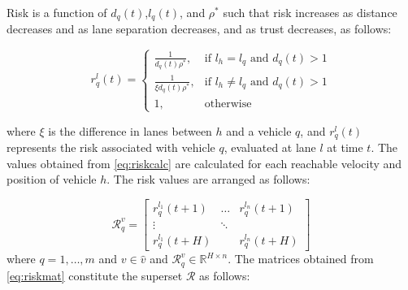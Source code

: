 \documentclass[letterpaper, 10 pt, conference]{ieeeconf}  %
\newcommand\NB[1]{$\spadesuit$\footnote{NB: #1}}
\newcommand\RP[1]{$\clubsuit$\footnote{RP: #1}}
\begin{document}



Risk is a function of $d_q(t)$,$l_q(t)$, and $\rho^*$ %
such that risk increases as distance decreases and as lane separation decreases, and as trust decreases, as follows: %

\begin{equation} \label{eq:riskcalc}
    r_{q}^{l}(t) =
    \begin{cases}
    \frac{1}{d_{q}(t)\rho^*},  & \text{if } l_h=l_q \text{ and } d_{q}(t) > 1  \\
    \frac{1}{\xi d_{q}(t)\rho^*},  & \text{if } l_h\neq l_q \text{ and } d_{q}(t) > 1  \\
        1,                     & \text{otherwise}  
    \end{cases}
\end{equation}

where $\xi$ is the difference in lanes between $h$ and a vehicle $q$,
and $r_{q}^{l}(t)$ represents the risk associated with vehicle $q$, evaluated at lane $l$ at time $t$. The values obtained from \eqref{eq:riskcalc} are calculated for each reachable velocity and position of vehicle $h$. The risk values are arranged as follows: %

\begin{equation} \label{eq:riskmat}
\mathcal{R}_{q}^{v}=
\begin{bmatrix}
r_q^{l_1}(t+1) & \dots & r_q^{l_n}(t+1) \\
\vdots & \ddots & \\
r_q^{l_1}(t+H) &    & r_q^{l_n}(t+H)
\end{bmatrix}
\end{equation}
where $q = 1,\ldots,m$ and $v\in\hat{v}$ and $\mathcal{R}_q^v\in\mathbb{R}^{H\times{n}}$. The matrices obtained from \eqref{eq:riskmat} constitute the superset $\mathcal{R}$ as follows:
\end{document}
